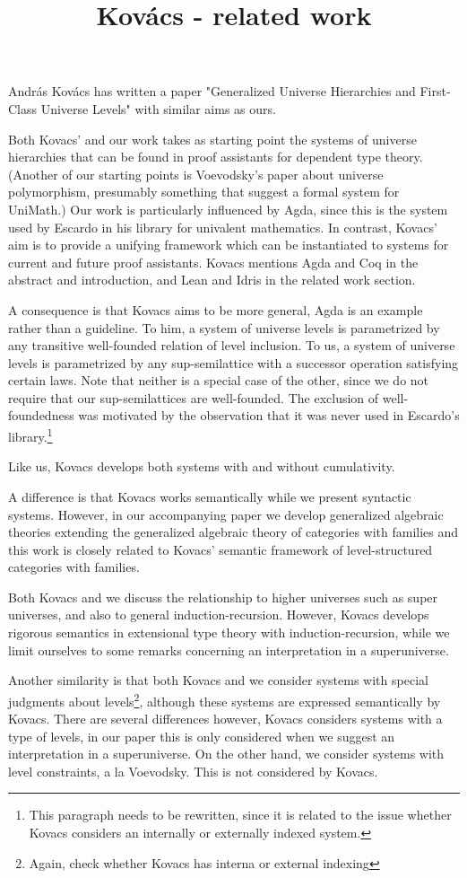 \documentclass[11pt,a4paper]{article}
\begin{document}
\title{Kov\'acs - related work}

Andr\'as Kov\'acs has written a paper "Generalized Universe Hierarchies and First-Class Universe Levels" with similar aims as ours. 

Both Kovacs' and our work takes as starting point the systems of universe hierarchies that can be found in proof assistants for dependent type theory. (Another of our starting points is Voevodsky's paper about universe polymorphism, presumably something that suggest a formal system for UniMath.) Our work is particularly influenced by Agda, since this is the system used by Escardo in his library for univalent mathematics. In contrast, Kovacs' aim is to provide a unifying framework which can be instantiated to systems for current and future proof assistants. Kovacs mentions Agda and Coq in the abstract and introduction, and Lean and Idris in the related work section.

A consequence is that Kovacs aims to be more general, Agda is an example rather than a guideline. To him, a system of universe levels is parametrized by any transitive well-founded relation of level inclusion. To us, a system of universe levels is parametrized by any sup-semilattice with a successor operation satisfying certain laws. Note that neither is a special case of the other, since we do not require that our sup-semilattices are well-founded. The exclusion of well-foundedness was motivated by the observation that it was never used in Escardo's library.\footnote{This paragraph needs to be rewritten, since it is related to the issue whether Kovacs considers an internally or externally indexed system.}

Like us, Kovacs develops both systems with and without cumulativity. 

A difference is that Kovacs works semantically while we present syntactic systems. However, in our accompanying paper we develop generalized algebraic theories extending the generalized algebraic theory of categories with families and this work is closely related to Kovacs' semantic framework of level-structured categories with families.

Both Kovacs and we discuss the relationship to higher universes such as super universes, and also to general induction-recursion. However, Kovacs develops rigorous semantics in extensional type theory with induction-recursion, while we limit ourselves to some remarks concerning an interpretation in a superuniverse.

Another similarity is that both Kovacs and we consider systems with special judgments about levels\footnote{Again, check whether Kovacs has interna or external indexing}, although these systems are expressed semantically by Kovacs. There are several differences however, Kovacs considers systems with a type of levels, in our paper this is only considered when we suggest an interpretation in a superuniverse. On the other hand, we consider systems with level constraints, a la Voevodsky. This is not considered by Kovacs.
\end{document}

